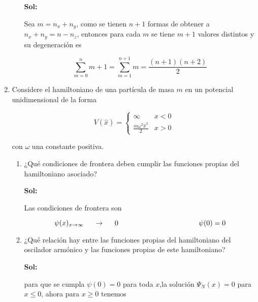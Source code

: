 \documentclass[12pt,a4paper]{article}
\begin{document}
\begin{enumerate}
\begin{enumerate}
    \textbf{Sol:}
    
    Sea $m = n_x + n_y$, como se tienen $n+1$ formas de obtener a $n_x + n_y = n - n_z$, entonces para cada $m$ se tiene $m + 1$ valores distintos y su degeneración es
    
    \begin{equation*}
        \sum_{m=0}^{n} m+1 = \sum_{m=1}^{n+1} m = \frac{(n+1)(n+2)}{2}
    \end{equation*}
    
    
    
\end{enumerate}






\item Considere el hamiltoniano de una partícula de masa $m$ en un potencial unidimensional de la forma

\begin{equation*}
    V(\hat{x}) = \left\{\begin{matrix}
    \infty & x< 0 \\
    \frac{m \omega^2 \hat{x}^2}{2} & x>0
    \end{matrix}\right.
\end{equation*}

con $\omega$ una constante positiva.

\begin{enumerate}
    \item ¿Qué condiciones de frontera deben cumplir las funciones propias del hamiltoniano asociado?
    
    \textbf{Sol:}
    
    Las condiciones de frontera son
    
    \begin{equation*}
        \psi(x)_{x \rightarrow \infty }  \hspace{0.5cm} \rightarrow \hspace{0.5cm} 0 \hspace{4cm} \psi(0) = 0 
    \end{equation*}
    
    
    
    
    \item ¿Qué relación hay entre las funciones propias del hamiltoniano del oscilador armónico y las funciones propias de este hamiltoniano?
    
    \textbf{Sol:}
    
    para que se cumpla $\psi(0) =0$ para toda $x$,la solución $\Psi_N (x) = 0$ para $x \leq 0$, ahora para $x \geq 0$ tenemos
    

\end{enumerate}
\end{enumerate}
\end{document}

